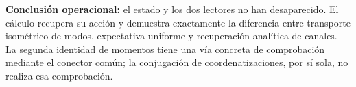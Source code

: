\textbf{Conclusión operacional:} el estado y los dos lectores no han desaparecido. El cálculo recupera su acción y demuestra exactamente la diferencia entre transporte isométrico de modos, expectativa uniforme y recuperación analítica de canales. La segunda identidad de momentos tiene una vía concreta de comprobación mediante el conector común; la conjugación de coordenatizaciones, por sí sola, no realiza esa comprobación.
